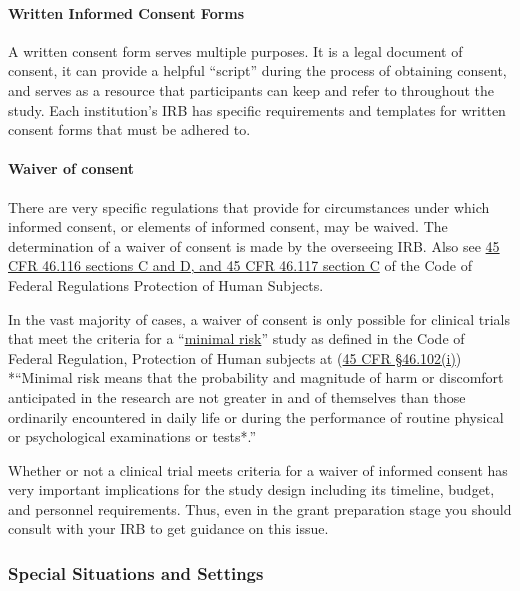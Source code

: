 \documentclass[]{book}
\theoremstyle{definition}
\theoremstyle{definition}
\theoremstyle{definition}
\theoremstyle{remark}
\begin{document}
\paragraph{Written Informed Consent
Forms}\label{written-informed-consent-forms}

A written consent form serves multiple purposes. It is a legal document
of consent, it can provide a helpful ``script'' during the process of
obtaining consent, and serves as a resource that participants can keep
and refer to throughout the study. Each institution's IRB has specific
requirements and templates for written consent forms that must be
adhered to.

\paragraph{Waiver of consent}\label{waiver-of-consent}

There are very specific regulations that provide for circumstances under
which informed consent, or elements of informed consent, may be waived.
The determination of a waiver of consent is made by the overseeing IRB.
Also see
\href{http://www.hhs.gov/ohrp/regulations-and-policy/regulations/45-cfr-46/index.html}{45
CFR 46.116 sections C and D, and 45 CFR 46.117 section C} of the Code of
Federal Regulations Protection of Human Subjects.

In the vast majority of cases, a waiver of consent is only possible for
clinical trials that meet the criteria for a
``\href{http://www.hhs.gov/ohrp/regulations-and-policy/regulations/45-cfr-46/index.html\#46.102}{minimal
risk}'' study as defined in the Code of Federal Regulation, Protection
of Human subjects at
(\href{http://www.hhs.gov/ohrp/humansubjects/guidance/45cfr46.html\#46.102}{45
CFR §46.102(i)}) *``Minimal risk means that the probability and
magnitude of harm or discomfort anticipated in the research are not
greater in and of themselves than those ordinarily encountered in daily
life or during the performance of routine physical or psychological
examinations or tests*.''

Whether or not a clinical trial meets criteria for a waiver of informed
consent has very important implications for the study design including
its timeline, budget, and personnel requirements. Thus, even in the
grant preparation stage you should consult with your IRB to get guidance
on this issue.

\subsubsection{Special Situations and
Settings}\label{special-situations-and-settings}
\end{document}
